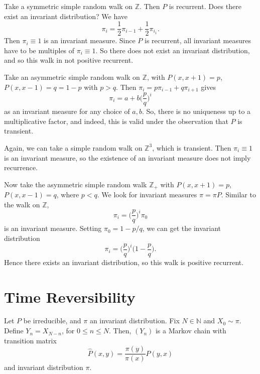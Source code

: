 \documentclass[12pt]{article}
\begin{document}
\begin{exbox}
	Take a symmetric simple random walk on $\mathbb{Z}$. Then $P$ is recurrent. Does there exist an invariant distribution? We have
	\[
	\pi_i = \frac{1}{2} \pi_{i-1} + \frac{1}{2} \pi_{i_1}
	.\]
	Then $\pi_i \equiv 1$ is an invariant measure. Since $P$ is recurrent, all invariant measures have to be multiples of $\pi_i \equiv 1$. So there does not exist an invariant distribution, and so this walk in not positive recurrent.

	Take an asymmetric simple random walk on $\mathbb{Z}$, with $P(x, x+1) = p$, $P(x, x-1) = q = 1-p$ with $p > q$. Then  $\pi_i = p \pi_{i-1} + q \pi_{i+1}$ gives
	\[
		\pi_i = a + b \biggl( \frac{p}{q} \biggr)^{i}
	\]
	as an invariant measure for any choice of $a, b$. So, there is no uniqueness up to a multiplicative factor, and indeed, this is valid under the observation that $P$ is transient.

	Again, we can take a simple random walk on $\mathbb{Z}^3$, which is transient. Then $\pi_i \equiv 1$ is an invariant measure, so the existence of an invariant measure does not imply recurrence.

	Now take the asymmetric simple random walk $\mathbb{Z}_{+}$ with $P(x, x+1) = p$, $P(x, x-1) = q$, where $p < q$. We look for invariant measures $\pi = \pi P$. Similar to the walk on $\mathbb{Z}$,
	\[
		\pi_i = \biggl( \frac{p}{q} \biggr)^{i} \pi_0
	\]
	is an invariant measure. Setting $\pi_0 = 1 - p/q$, we can get the invariant distribution
	\[
		\pi_i = \biggl( \frac{p}{q} \biggr)^{i} \biggl(1 - \frac{p}{q} \biggr)
	.\]
	Hence there exists an invariant distribution, so this walk is positive recurrent.
\end{exbox}

\newpage

\section{Time Reversibility}%
\label{sec:time_reversibility}

\begin{proposition}
	Let $P$ be irreducible, and $\pi$ an invariant distribution. Fix $N \in \mathbb{N}$ and $X_0 \sim \pi$. Define $Y_n = X_{N - n}$, for $0 \leq n \leq N$. Then, $(Y_n)$ is a Markov chain with transition matrix
	\[
		\hat P(x, y) = \frac{\pi(y)}{\pi(x)}P(y, x)
	\]
	and invariant distribution $\pi$.
\end{proposition}
\end{document}
